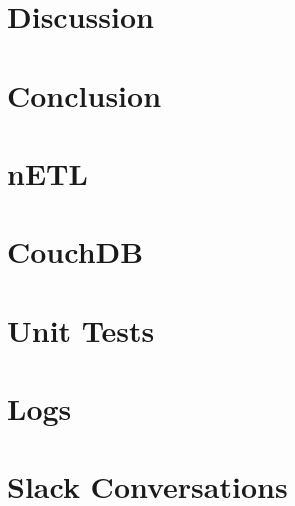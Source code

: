 \documentclass[
    a4paper
]{report}
\begin{document}
\chapter{Discussion}







\chapter{Conclusion}



\newpage




\begin{appendices}
    \chapter{nETL}
    
    
    \chapter{CouchDB}
    
    \chapter{Unit Tests}
    \label{unit-tests}
    
    \chapter{Logs}
    
    \chapter{Slack Conversations}
    
    \newpage
    \listoffigures
    \newpage
    \listoftables
    \newpage
\end{appendices}

\end{document}
